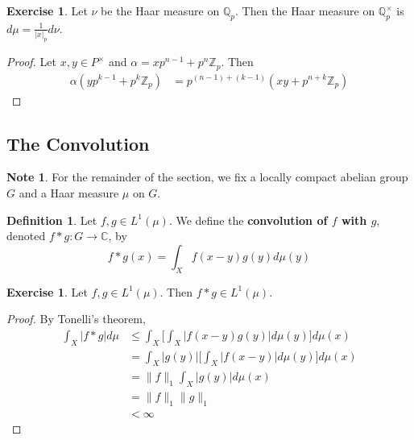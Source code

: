 \documentclass[12pt]{amsart}
\theoremstyle{definition}
\newtheorem{defn}[definition]{Definition}
\newtheorem{note}[definition]{Note}
\newtheorem{ex}[definition]{Exercise}
\newcommand{\al}{\alpha}
\newcommand{\C}{\mathbb{C}}
\newcommand{\Z}{\mathbb{Z}}
\newcommand{\Q}{\mathbb{Q}}
\begin{document}
	\begin{ex}
		Let $\nu$ be the Haar measure on $\Q_p$. Then the Haar measure on $\Q_p^{\times}$  is $d \mu = \frac{1}{|x|_p}d \nu$.
	\end{ex}

	\begin{proof}
		Let $x, y \in P^{\times}$ and $\al = xp^{n-1} + p^n\Z_p$. Then 
		\begin{align*}
			\al (yp^{k-1} + p^k \Z_p) 
			& = p^{(n-1)+ (k-1)}(xy + p^{n+k} \Z_p) 
		\end{align*}
	\end{proof}
	
	
	
	
	
	
	
	
	
	
	
	
	
	
	
	\newpage
	\subsection{The Convolution}	
	\begin{note}
	For the remainder of the section, we fix a locally compact abelian group $G$ and a Haar measure $\mu$ on $G$. 
	\end{note}
	
	\begin{defn}
	Let $f, g \in L^1(\mu)$. We define the \textbf{convolution of $f$ with $g$}, denoted $f * g: G \rightarrow \C$, by $$ f * g(x) = \int_X f(x-y)g(y) d\mu(y)$$
	\end{defn}
	
	\begin{ex}
	Let $f, g \in L^1(\mu)$. Then $f * g \in L^1(\mu)$. 
	\end{ex}
	
	\begin{proof}
	By Tonelli's theorem, 
	\begin{align*}
	\int_X |f *g| d\mu 
	&\leq \int_X \bigg[  \int_X |f(x-y)g(y)| d\mu(y) \bigg] d\mu(x) \\
	&= \int_X |g(y)| \bigg[  \int_X |f(x-y)| d\mu(y) \bigg] d\mu(x) \\
	&=  \|f\|_1 \int_X |g(y)| d\mu(x) \\
	&= \|f\|_1 \|g\|_1\\
	& < \infty
	\end{align*}
	\end{proof}
	
\end{document}
